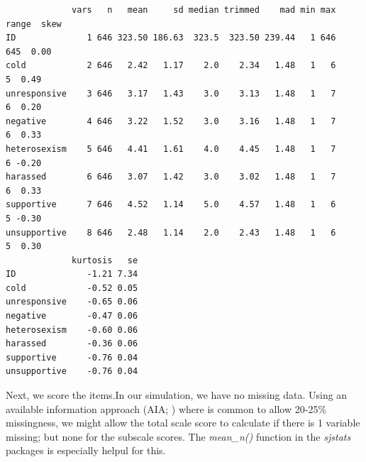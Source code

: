 \documentclass[
  english,
]{book}
\begin{document}
\begin{verbatim}
             vars   n   mean     sd median trimmed    mad min max range  skew
ID              1 646 323.50 186.63  323.5  323.50 239.44   1 646   645  0.00
cold            2 646   2.42   1.17    2.0    2.34   1.48   1   6     5  0.49
unresponsive    3 646   3.17   1.43    3.0    3.13   1.48   1   7     6  0.20
negative        4 646   3.22   1.52    3.0    3.16   1.48   1   7     6  0.33
heterosexism    5 646   4.41   1.61    4.0    4.45   1.48   1   7     6 -0.20
harassed        6 646   3.07   1.42    3.0    3.02   1.48   1   7     6  0.33
supportive      7 646   4.52   1.14    5.0    4.57   1.48   1   6     5 -0.30
unsupportive    8 646   2.48   1.14    2.0    2.43   1.48   1   6     5  0.30
             kurtosis   se
ID              -1.21 7.34
cold            -0.52 0.05
unresponsive    -0.65 0.06
negative        -0.47 0.06
heterosexism    -0.60 0.06
harassed        -0.36 0.06
supportive      -0.76 0.04
unsupportive    -0.76 0.04
\end{verbatim}

Next, we score the items.In our simulation, we have no missing data. Using an available information approach (AIA; \citep{parent_handling_2013}) where is common to allow 20-25\% missingness, we might allow the total scale score to calculate if there is 1 variable missing; but none for the subscale scores. The \emph{mean\_n()} function in the \emph{sjstats} packages is especially helpul for this.
\end{document}
